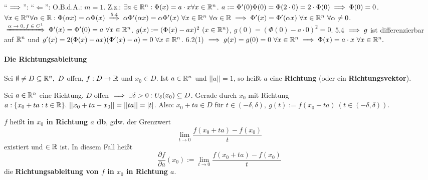\documentclass[a4paper,twoside,DIV15,BCOR12mm]{scrbook}
\begin{document}
\begin{beweis}
``$\implies$'':
``$\Leftarrow$'': O.B.d.A.: $m=1$. Z.z.: $\exists a \in \mathbb{R}^n:\Phi(x)=a\cdot x \forall x \in \mathbb{R}^n$.
$a:=\Phi'(0) \Phi(0)=\Phi(2\cdot0)=2\cdot \Phi(0) \implies \Phi(0)=0$.
$\forall x \in \MdR^n \forall \alpha \in \MdR: \Phi(\alpha x)=\alpha\Phi(x) \folgtnach{5.4} \alpha \Phi'(\alpha x)=\alpha\Phi'(x)\ \forall x \in \MdR^n\ \forall \alpha \in \MdR
\folgt \Phi'(x)=\Phi'(\alpha x)\ \forall x \in\MdR^n\ \forall\alpha\ne0$.$ \folgtnach{$\alpha\to0, f\in C^1$} \Phi'(x)=\Phi'(0)=a\ \forall x \in\MdR^n$.
$g(x):=(\Phi(x)-ax)^2\ (x \in \mathbb{R}^n)$, $ g(0)=(\Phi(0)-a\cdot0)^2=0$.
5.4 $\implies g$ ist differenzierbar auf $\mathbb{R}^n$ und $g'(x)=2(\Phi(x)-ax)(\Phi'(x)-a)=0\ \forall x \in \mathbb{R}^n$.
6.2(1) $\folgt g(x)=g(0)=0\ \forall x\in\MdR^n \folgt \Phi(x)=a\cdot x\ \forall x\in \MdR^n.$
\end{beweis}

\paragraph{Die Richtungsableitung}
Sei $\emptyset \ne D \subseteq \MdR^n,\ D$ offen, $f:D \to \mathbb{R}$ und $x_0 \in D$. Ist $a \in \mathbb{R}^n$ und $||a||=1$, so heißt $a$ eine \textbf{Richtung} (oder ein \textbf{Richtungsvektor}).

Sei $a \in \mathbb{R}^n$ eine Richtung. $D$ offen $\implies \exists \delta>0: U_\delta(x_0) \subseteq D$. Gerade durch $x_0$ mit Richtung $a:\{x_0+ta:t\in\mathbb{R}\}.\  ||x_0+ta-x_0|| = ||ta|| = |t|$. Also: $x_0+ta \in D$ für $t \in (-\delta,\delta),\ g(t) := f(x_0+ta)\ (t \in (-\delta,\delta))$.

$f$ heißt \textbf{in $x_0$ in Richtung $a$ db}, gdw. der Grenzwert $$\lim_{t\to 0} \frac{f(x_0+ta)-f(x_0)}{t}$$ existiert und $\in \mathbb{R}$ ist. In diesem Fall heißt $$\frac{\partial f}{\partial a}(x_0) := \lim_{t\to 0} \frac{f(x_0+ta)-f(x_0)}{t}$$ die \textbf{Richtungsableitung von $f$ in $x_0$ in Richtung $a$}.
\end{document}
